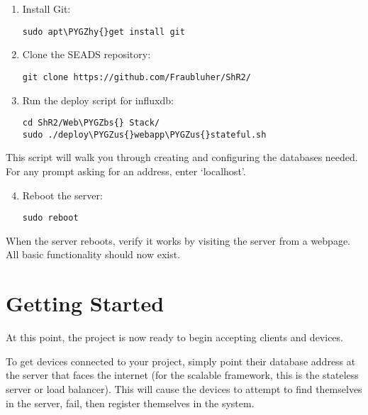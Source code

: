 \documentclass[letterpaper,10pt,english]{sphinxmanual}
\def\PYGZbs{\char`\\}
\def\PYGZus{\char`\_}
\def\PYGZhy{\char`\-}
\begin{document}
\begin{enumerate}
\item {} 
Install Git:

\begin{Verbatim}[commandchars=\\\{\}]
sudo apt\PYGZhy{}get install git
\end{Verbatim}

\item {} 
Clone the SEADS repository:

\begin{Verbatim}[commandchars=\\\{\}]
git clone https://github.com/Fraubluher/ShR2/
\end{Verbatim}

\item {} 
Run the deploy script for influxdb:

\begin{Verbatim}[commandchars=\\\{\}]
cd ShR2/Web\PYGZbs{} Stack/
sudo ./deploy\PYGZus{}webapp\PYGZus{}stateful.sh
\end{Verbatim}

\end{enumerate}

This script will walk you through creating and configuring the databases needed. For any prompt asking for an address, enter `localhost'.
\begin{enumerate}
\setcounter{enumi}{3}
\item {} 
Reboot the server:

\begin{Verbatim}[commandchars=\\\{\}]
sudo reboot
\end{Verbatim}

\end{enumerate}

When the server reboots, verify it works by visiting the server from a webpage. All basic functionality should now exist.


\chapter{Getting Started}
\label{getting-started:getting-started}\label{getting-started::doc}\label{getting-started:id1}
At this point, the project is now ready to begin accepting clients and devices.

To get devices connected to your project, simply point their database address at the server that faces the internet (for the scalable framework, this is the stateless server or load balancer). This will cause the devices to attempt to find themselves in the server, fail, then register themselves in the system.
\end{document}
